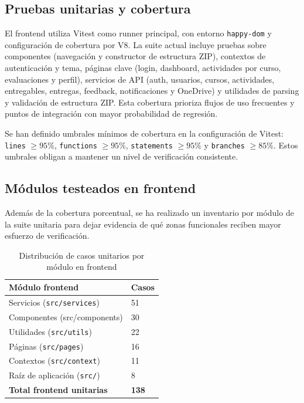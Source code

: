 \subsection{Pruebas unitarias y cobertura}

El frontend utiliza Vitest como runner principal,
con entorno \texttt{happy-dom} y configuraci\'on de cobertura por V8.
La suite actual incluye pruebas sobre componentes (navegaci\'on y constructor de estructura ZIP), contextos de autenticaci\'on y tema, p\'aginas clave (login, dashboard, actividades por curso, evaluaciones y perfil), servicios de API (auth, usuarios, cursos, actividades, entregables, entregas, feedback, notificaciones y OneDrive) y utilidades de parsing y validaci\'on de estructura ZIP. Esta cobertura prioriza flujos de uso frecuentes y puntos de integraci\'on con mayor probabilidad de regresi\'on.

Se han definido umbrales m\'inimos de cobertura en la configuraci\'on de Vitest: \texttt{lines} \(\ge 95\%\), \texttt{functions} \(\ge 95\%\), \texttt{statements} \(\ge 95\%\) y \texttt{branches} \(\ge 85\%\). Estos umbrales obligan a mantener un nivel de verificaci\'on consistente.

\subsection{M\'odulos testeados en frontend}

Adem\'as de la cobertura porcentual, se ha realizado un inventario por m\'odulo
de la suite unitaria para dejar evidencia de qu\'e zonas funcionales reciben
mayor esfuerzo de verificaci\'on.

\begin{table}[!htbp]
\centering
\begin{tabular}{|P{5.6cm}|P{2.2cm}|}
\hline
\textbf{M\'odulo frontend} & \textbf{Casos} \\
\hline
Servicios (\texttt{src/services}) & 51 \\
\hline
Componentes (src/components) & 30 \\
\hline
Utilidades (\texttt{src/utils}) & 22 \\
\hline
P\'aginas (\texttt{src/pages}) & 16 \\
\hline
Contextos (\texttt{src/context}) & 11 \\
\hline
Ra\'iz de aplicaci\'on (\texttt{src/}) & 8 \\
\hline
\textbf{Total frontend unitarias} & \textbf{138} \\
\hline
\end{tabular}
\caption{Distribuci\'on de casos unitarios por m\'odulo en frontend}
\label{tab:frontend-modulos-testeados}
\end{table}

